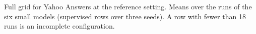 \begin{table}[t]
  \centering
  \footnotesize
  
  \caption{Full grid for Yahoo Answers at the reference setting. Means over the runs of the six small models (supervised rows over three seeds). A row with fewer than 18 runs is an incomplete configuration.}
  \label{tab:grid_yahoo}
\end{table}
